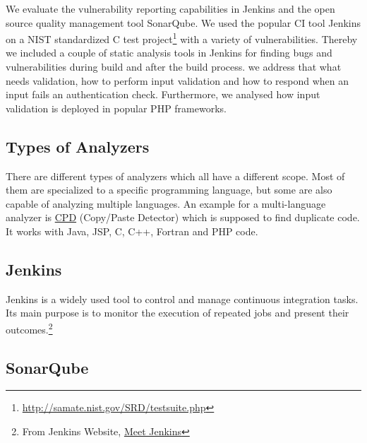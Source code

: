 \documentclass[conference]{IEEEtran}
\begin{document}
We evaluate the vulnerability reporting capabilities in Jenkins and the open source quality management tool SonarQube.
We used the popular CI tool Jenkins on a NIST standardized C test project\footnote{\url{http://samate.nist.gov/SRD/testsuite.php}} with a variety of vulnerabilities.
Thereby we included a couple of static analysis tools in Jenkins for finding bugs and vulnerabilities during build and after the build process.
we address that what needs validation, how to perform input validation and how to respond when an input fails an authentication check. Furthermore, we analysed how input validation is deployed in popular PHP frameworks.

\subsection{Types of Analyzers}
There are different types of analyzers which all have a different scope. Most of them are specialized to a specific programming language, but some are also capable of analyzing multiple languages. An example for a multi-language analyzer is \href{http://pmd.sourceforge.net/pmd-4.3.0/cpd.html}{CPD} (Copy/Paste Detector) which is supposed to find duplicate code. It works with Java, JSP, C, C++, Fortran and PHP code.

\subsection{Jenkins}

Jenkins is a widely used tool to control and manage continuous integration tasks. Its main purpose is to monitor the execution of repeated jobs and present their outcomes.\footnote{From Jenkins Website, \href{https://wiki.jenkins-ci.org/display/JENKINS/Meet+Jenkins}{Meet Jenkins}}

\subsection{SonarQube}
\end{document}
